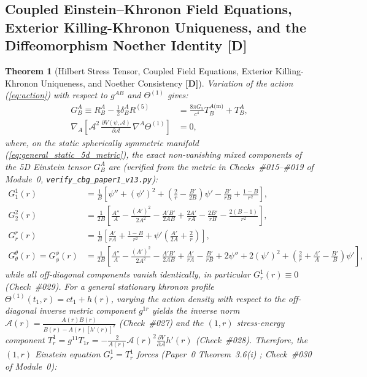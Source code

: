 \documentclass[11pt,a4paper]{article}
\newcommand{\catD}{\textbf{\textcolor{blue!75!black}{[D]}}}
\newtheorem{theorem}{Theorem}[section]
\theoremstyle{definition}
\theoremstyle{remark}
\begin{document}
\subsection{\texorpdfstring{Coupled Einstein--Khronon Field Equations, Exterior Killing-Khronon Uniqueness, and the Diffeomorphism Noether Identity \catD}{Coupled Einstein-Khronon Field Equations, Exterior Killing-Khronon Uniqueness, and the Diffeomorphism Noether Identity}}

\begin{theorem}[Hilbert Stress Tensor, Coupled Field Equations, Exterior Killing-Khronon Uniqueness, and Noether Consistency \catD]
\label{thm:fieldeqs}
Variation of the action (\ref{eq:action}) with respect to $g^{AB}$ and $\Theta^{(1)}$ gives:
\begin{align}
  G^A_B \equiv R^A_B - \frac{1}{2}\delta^A_B R^{(5)} &= \frac{8\pi G_5}{c^4}T^{A\text{(m)}}_B + T^A_B, \label{eq:einstein} \\[3pt]
  \nabla_A\!\left[\mathcal{A}^2\,\frac{\partial V(\psi,\mathcal{A})}{\partial\mathcal{A}}\,\nabla^A\Theta^{(1)}\right] &= 0, \label{eq:khronon}
\end{align}
where, on the static spherically symmetric manifold (\ref{eq:general_static_5d_metric}), the exact non-vanishing mixed components of the 5D Einstein tensor $G^A_B$ are (verified from the metric in Checks~\#015--\#019 of Module~0, \allowbreak\texttt{verify\_cbg\_paper1\_v13.py}):
\begin{align}
  G^1_1(r) &= \frac{1}{B}\left[\psi'' + (\psi')^2 + \left(\frac{2}{r} - \frac{B'}{2 B}\right)\psi' - \frac{B'}{r B} + \frac{1 - B}{r^2}\right], \label{eq:exact_G11_5d} \\[4pt]
  G^2_2(r) &= \frac{1}{2 B}\left[\frac{A''}{A} - \frac{(A')^2}{2 A^2} - \frac{A' B'}{2 A B} + \frac{2 A'}{r A} - \frac{2 B'}{r B} - \frac{2(B - 1)}{r^2}\right], \label{eq:exact_G22_5d} \\[4pt]
  G^r_r(r) &= \frac{1}{B}\left[\frac{A'}{r A} + \frac{1 - B}{r^2} + \psi'\left(\frac{A'}{2 A} + \frac{2}{r}\right)\right], \label{eq:exact_Grr_5d} \\[4pt]
  G^{\theta}_{\theta}(r) = G^{\phi}_{\phi}(r) &= \frac{1}{2 B}\left[\frac{A''}{A} - \frac{(A')^2}{2 A^2} - \frac{A' B'}{2 A B} + \frac{A'}{r A} - \frac{B'}{r B} + 2\psi'' + 2(\psi')^2 + \left(\frac{2}{r} + \frac{A'}{A} - \frac{B'}{B}\right)\psi'\right], \label{eq:exact_Gthth_5d}
\end{align}
while all off-diagonal components vanish identically, in particular $G^1_r(r) \equiv 0$ (Check~\#029). For a general stationary khronon profile $\Theta^{(1)}(t_1, r) = c t_1 + h(r)$, varying the action density with respect to the off-diagonal inverse metric component $g^{1r}$ yields the inverse norm $\mathcal{A}(r) = \frac{A(r)B(r)}{B(r) - A(r)[h'(r)]^2}$ (Check~\#027) and the $(1,r)$ stress-energy component $T^1_r = g^{11}T_{1r} = -\frac{2}{A(r)}\mathcal{A}(r)^2\frac{\partial V}{\partial\mathcal{A}}h'(r)$ (Check~\#028). Therefore, the $(1,r)$ Einstein equation $G^1_r = T^1_r$ forces (Paper~0 Theorem~3.6(i) \cite{JV_Paper0}; Check~\#030 of Module~0):

\end{theorem}
\end{document}
